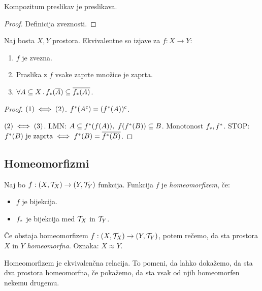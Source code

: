 \begin{trditev}
    Kompozitum preslikav je preslikava.
\end{trditev}

\begin{proof}
    Definicija zveznosti.
\end{proof}

\begin{trditev}
    Naj bosta $X, Y$ prostora. Ekvivalentne so izjave za $f: X \to Y$:
    \begin{enumerate}
        \item $f$ je zvezna.
        \item Praslika z $f$ vsake zaprte množice je zaprta.
        \item $\forall A \subseteq X \,.\, f_{*}(\overline{A}) \subseteq \overline{f_{*}(A)}$.
    \end{enumerate}
\end{trditev}

\begin{proof}
    $(1) \iff (2)$. $f^{*}(A^c) = (f^{*}(A))^c$.

    $(2) \iff (3)$. LMN: $A \subseteq f^{*}(f(A)), \ f(f^{*}(B)) \subseteq B$. Monotonost $f_{*}, f^{*}$. STOP:
    $f^{*}(B) \text{ je zaprta} \iff f^{*}(B) = \overline{f^{*}(B)}$.
\end{proof}

\newpage
\subsection{Homeomorfizmi}
\begin{definicija}
    Naj bo $f: (X, \mathcal{T}_X) \to (Y, \mathcal{T}_Y)$ funkcija. Funkcija $f$ je \emph{homeomorfizem}, če:
    \begin{itemize}
        \item $f$ je bijekcija.
        \item $f_{*}$ je bijekcija med $\mathcal{T}_X$ in $\mathcal{T}_Y$.
    \end{itemize}
\end{definicija}

\begin{definicija}
    Če obstaja homeomorfizem $f: (X, \mathcal{T}_X) \to (Y, \mathcal{T}_Y)$, potem rečemo, da sta prostora $X$ in $Y$ \emph{homeomorfna}. Oznaka: $X \approx  Y$.
\end{definicija}

\begin{opomba}
    Homeomorfizem je ekvivalenčna relacija. To pomeni, da lahko dokažemo, da sta dva prostora homeomorfna, če pokažemo, da sta vsak od njih homeomorfen nekemu drugemu.
\end{opomba}

